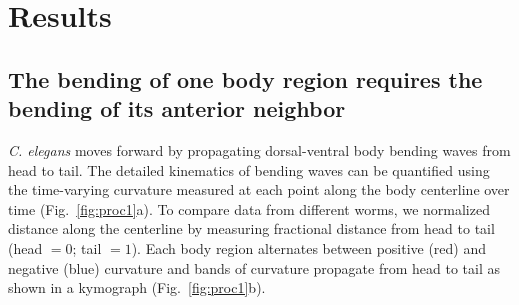 \section{Results}
\subsection{The bending of one body region requires the bending of its anterior neighbor}

\textit{C. elegans} moves forward by propagating dorsal-ventral body bending waves from head to tail. 
The detailed kinematics of bending waves can be quantified using the time-varying curvature 
measured at each point along the body centerline over time (Fig.~\ref{fig:proc1}a). To compare data from different worms, we normalized distance along the centerline by measuring fractional distance 
from head to tail (head $=0$; tail $=1$). Each body region alternates between positive (red) and 
negative (blue) curvature and bands of curvature propagate from head to tail as shown in a 
kymograph (Fig.~\ref{fig:proc1}b). 




